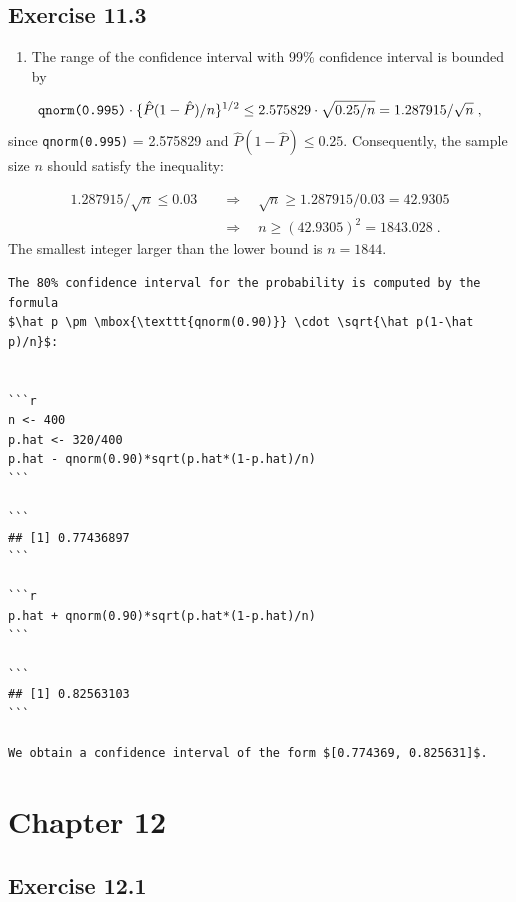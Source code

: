 \documentclass[]{krantz}
\providecommand{\tightlist}{%
  \setlength{\itemsep}{0pt}\setlength{\parskip}{0pt}}
\theoremstyle{definition}
\theoremstyle{definition}
\theoremstyle{definition}
\theoremstyle{remark}
\begin{document}
\subsection*{Exercise 11.3}\label{exercise-11.3}


\begin{enumerate}
\def\labelenumi{\arabic{enumi}.}
\tightlist
\item
  The range of the confidence interval with 99\% confidence interval is
  bounded by
\end{enumerate}

\[\mbox{\texttt{qnorm(0.995)}}\cdot \{\hat P (1-\hat P)/n\}^{1/2} \leq 2.575829 \cdot \sqrt{0.25/n} = 1.287915/\sqrt{n}\;,\]
since \texttt{qnorm(0.995)} = 2.575829 and
\(\hat P (1-\hat P) \leq 0.25\). Consequently, the sample size \(n\)
should satisfy the inequality:

\[\begin{aligned}
1.287915/\sqrt{n} \leq 0.03\quad  &\Longrightarrow  \quad \sqrt{n} \geq 1.287915/0.03 = 42.9305\\
&\Longrightarrow \quad  n \geq (42.9305)^2 = 1843.028\;.\end{aligned}\]
The smallest integer larger than the lower bound is \(n=1844\).

\begin{verbatim}
The 80% confidence interval for the probability is computed by the formula
$\hat p \pm \mbox{\texttt{qnorm(0.90)}} \cdot \sqrt{\hat p(1-\hat p)/n}$:


```r
n <- 400
p.hat <- 320/400
p.hat - qnorm(0.90)*sqrt(p.hat*(1-p.hat)/n)
```

```
## [1] 0.77436897
```

```r
p.hat + qnorm(0.90)*sqrt(p.hat*(1-p.hat)/n)
```

```
## [1] 0.82563103
```

We obtain a confidence interval of the form $[0.774369, 0.825631]$.
\end{verbatim}

\section*{Chapter 12}\label{chapter-12}


\subsection*{Exercise 12.1}\label{exercise-12.1}
\end{document}
